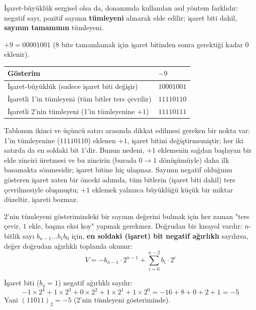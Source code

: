 İşaret-büyüklük sezgisel olsa da, donanımda kullanılan asıl yöntem farklıdır: negatif
sayı, pozitif sayının \textbf{tümleyeni} alınarak elde edilir; işaret biti dahil,
\textbf{sayının tamamının} tümleyeni.

\begin{ornek}
$+9=00001001$ ($8$ bite tamamlamak için işaret bitinden sonra gerektiği kadar $0$ eklenir).
\begin{center}
\begin{tabular}{ll}
\toprule
Gösterim & $-9$ \\
\midrule
İşaret-büyüklük (sadece işaret biti değişir) & $10001001$ \\
İşaretli 1'in tümleyeni (tüm bitler ters çevrilir) & $11110110$ \\
İşaretli 2'nin tümleyeni (1'in tümleyenine $+1$) & $11110111$ \\
\bottomrule
\end{tabular}
\end{center}
Tablonun ikinci ve üçüncü satırı arasında dikkat edilmesi gereken bir nokta var: 1'in
tümleyenine ($11110110$) eklenen $+1$, işaret bitini değiştirmemiştir; her iki satırda da
en soldaki bit $1$'dir. Bunun nedeni, $+1$ eklemenin sağdan başlayan bir elde zinciri
üretmesi ve bu zincirin (burada $0\to1$ dönüşümüyle) daha ilk basamakta sönmesidir; işaret
bitine hiç ulaşmaz. Sayının negatif olduğunu gösteren işaret zaten bir önceki adımda, tüm
bitlerin (işaret biti dahil) ters çevrilmesiyle oluşmuştu; $+1$ eklemek yalnızca büyüklüğü
küçük bir miktar düzeltir, işareti bozmaz.
\end{ornek}

\begin{bilginot}
$2$'nin tümleyeni gösterimindeki bir sayının değerini bulmak için her zaman "ters çevir,
$1$ ekle, başına eksi koy" yapmak gerekmez. Doğrudan bir kısayol vardır: $n$-bitlik sayı
$b_{n-1}\ldots b_1b_0$ için, \textbf{en soldaki (işaret) bit negatif ağırlıklı} sayılırsa,
değer doğrudan ağırlıklı toplamla okunur:
\[
V = -b_{n-1}\cdot2^{n-1} + \sum_{i=0}^{n-2}b_i\cdot2^i
\]
\end{bilginot}

\begin{ornek}
İşaret biti ($b_4=1$) negatif ağırlıklı sayılır:
\[
-1\times2^4+1\times2^3+0\times2^2+1\times2^1+1\times2^0 = -16+8+0+2+1=-5
\]
Yani $(11011)_2=-5$ (2'nin tümleyeni gösteriminde).
\end{ornek}

